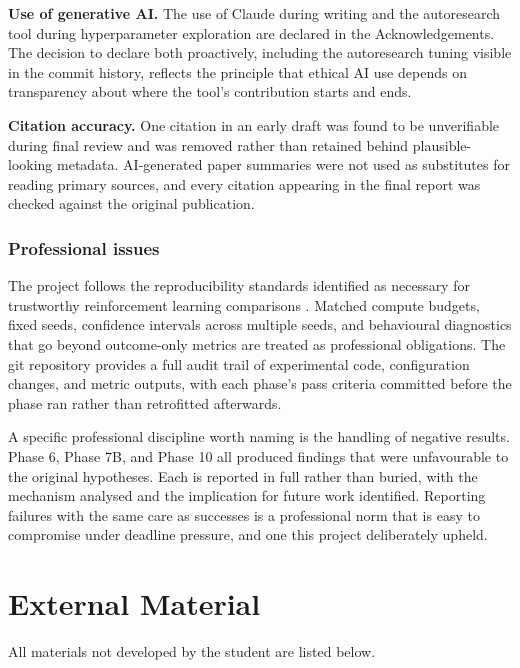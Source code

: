 \begin{appendices}
\textbf{Use of generative AI.} The use of Claude during writing and the autoresearch tool during hyperparameter exploration are declared in the Acknowledgements. The decision to declare both proactively, including the autoresearch tuning visible in the commit history, reflects the principle that ethical AI use depends on transparency about where the tool's contribution starts and ends.

\textbf{Citation accuracy.} One citation in an early draft was found to be unverifiable during final review and was removed rather than retained behind plausible-looking metadata. AI-generated paper summaries were not used as substitutes for reading primary sources, and every citation appearing in the final report was checked against the original publication.

\subsection{Professional issues}

The project follows the reproducibility standards identified as necessary for trustworthy reinforcement learning comparisons \citep{henderson2018deep, agarwal2021statistical}. Matched compute budgets, fixed seeds, confidence intervals across multiple seeds, and behavioural diagnostics that go beyond outcome-only metrics are treated as professional obligations. The git repository provides a full audit trail of experimental code, configuration changes, and metric outputs, with each phase's pass criteria committed before the phase ran rather than retrofitted afterwards.

A specific professional discipline worth naming is the handling of negative results. Phase 6, Phase 7B, and Phase 10 all produced findings that were unfavourable to the original hypotheses. Each is reported in full rather than buried, with the mechanism analysed and the implication for future work identified. Reporting failures with the same care as successes is a professional norm that is easy to compromise under deadline pressure, and one this project deliberately upheld.

\chapter{External Material}
\label{appendix:external}

All materials not developed by the student are listed below.


\end{appendices}
